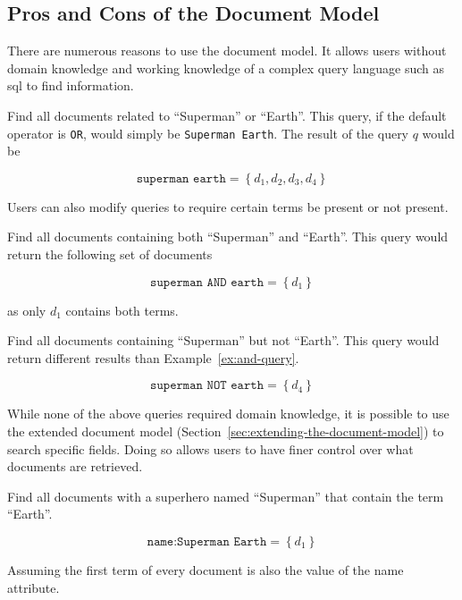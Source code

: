 	\subsection{Pros and Cons of the Document Model}
		There are numerous reasons to use the document model.  It allows users without domain knowledge and working knowledge of a complex query language such as \gls{sql} to find information.
		
		\begin{ex}
			Find all documents related to ``Superman'' or ``Earth''.  This query, if the default operator is \texttt{OR}, would simply be \texttt{Superman Earth}.  The result of the query $q$ would be
			
			$$\texttt{superman earth} = \left\{d_1, d_2, d_3, d_4\right\}$$
		\end{ex}
		
		Users can also modify queries to require certain terms be present or not present.
		
		\begin{ex}
		\label{ex:and-query}
			Find all documents containing both ``Superman'' and ``Earth''.  This query would return the following set of documents
			
			$$\texttt{superman AND earth} = \left\{d_1\right\}$$
			
			as only $d_1$ contains both terms.
		\end{ex}
		
		\begin{ex}
			Find all documents containing ``Superman'' but not ``Earth''.  This query would return different results than Example~\ref{ex:and-query}.
			
			$$\texttt{superman NOT earth} = \left\{d_4\right\}$$
		\end{ex}
		
		While none of the above queries required domain knowledge, it is possible to use the extended document model (Section~\ref{sec:extending-the-document-model}) to search specific fields.  Doing so allows users to have finer control over what documents are retrieved.
		
		\begin{ex}
			Find all documents with a superhero named ``Superman'' that contain the term ``Earth''.
			
			$$\texttt{name:Superman Earth} = \left\{d_1\right\}$$
			
			Assuming the first term of every document is also the value of the name attribute.
		\end{ex}
		
